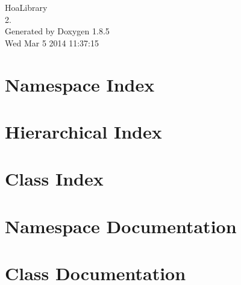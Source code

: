 \documentclass[twoside]{book}
\newcommand{\clearemptydoublepage}{%
  \newpage{\pagestyle{empty}\cleardoublepage}%
}
\begin{document}
\hypersetup{pageanchor=false}
\begin{titlepage}
\vspace*{7cm}
\begin{center}%
{\Large Hoa\-Library \\[1ex]\large 2. }\\
\vspace*{1cm}
{\large Generated by Doxygen 1.8.5}\\
\vspace*{0.5cm}
{\small Wed Mar 5 2014 11:37:15}\\
\end{center}
\end{titlepage}
\clearemptydoublepage
\tableofcontents
\clearemptydoublepage
{}
\hypersetup{pageanchor=true}

\chapter{Namespace Index}

\chapter{Hierarchical Index}

\chapter{Class Index}

\chapter{Namespace Documentation}


\chapter{Class Documentation}



































\newpage
{}
{}
\printindex
\end{document}
